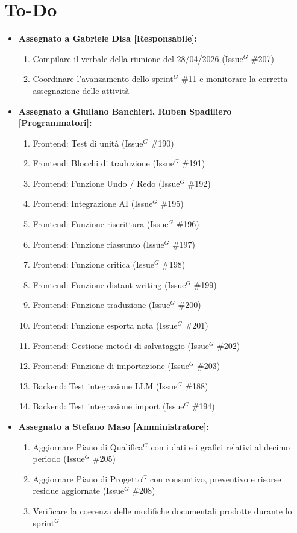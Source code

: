 \documentclass[a4paper,10pt]{article}
\begin{document}
\section*{To-Do}
\begin{itemize}
\item \textbf{Assegnato a Gabriele Disa [Responsabile]:}
    \begin{enumerate}
    \item Compilare il verbale della riunione del 28/04/2026 (Issue$^G$ \#207)
    \item Coordinare l'avanzamento dello sprint$^G$ \#11 e monitorare la corretta assegnazione delle attività
    \end{enumerate}

\item \textbf{Assegnato a Giuliano Banchieri, Ruben Spadiliero [Programmatori]:}
    \begin{enumerate}
        \item Frontend: Test di unità (Issue$^G$ \#190)
        \item Frontend: Blocchi di traduzione (Issue$^G$ \#191)
        \item Frontend: Funzione Undo / Redo (Issue$^G$ \#192)
        \item Frontend: Integrazione AI (Issue$^G$ \#195)
        \item Frontend: Funzione riscrittura (Issue$^G$ \#196)
        \item Frontend: Funzione riassunto (Issue$^G$ \#197)
        \item Frontend: Funzione critica (Issue$^G$ \#198)
        \item Frontend: Funzione distant writing (Issue$^G$ \#199)
        \item Frontend: Funzione traduzione (Issue$^G$ \#200)
        \item Frontend: Funzione esporta nota (Issue$^G$ \#201)
        \item Frontend: Gestione metodi di salvataggio (Issue$^G$ \#202)
        \item Frontend: Funzione di importazione (Issue$^G$ \#203)
        \item Backend: Test integrazione LLM (Issue$^G$ \#188)
        \item Backend: Test integrazione import (Issue$^G$ \#194)
  \end{enumerate}

\item \textbf{Assegnato a Stefano Maso [Amministratore]:}
    \begin{enumerate}
    \item Aggiornare Piano di Qualifica$^G$ con i dati e i grafici relativi al decimo periodo (Issue$^G$ \#205)
    \item Aggiornare Piano di Progetto$^G$ con consuntivo, preventivo e risorse residue aggiornate (Issue$^G$ \#208)
    \item Verificare la coerenza delle modifiche documentali prodotte durante lo sprint$^G$
    \end{enumerate}


\end{itemize}
\end{document}
